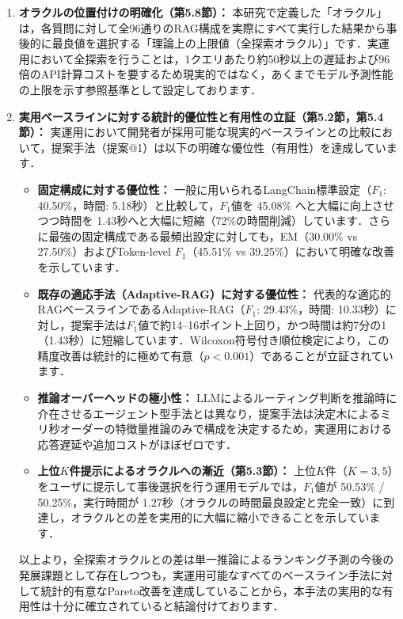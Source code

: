 \documentclass{jsarticle}
\begin{document}
\begin{enumerate}
\item \textbf{オラクルの位置付けの明確化（第5.8節）：}
本研究で定義した「オラクル」は，各質問に対して全96通りのRAG構成を実際にすべて実行した結果から事後的に最良値を選択する「理論上の上限値（全探索オラクル）」です．実運用において全探索を行うことは，1クエリあたり約50秒以上の遅延および96倍のAPI計算コストを要するため現実的ではなく，あくまでモデル予測性能の上限を示す参照基準として設定しております．

\item \textbf{実用ベースラインに対する統計的優位性と有用性の立証（第5.2節，第5.4節）：}
実運用において開発者が採用可能な現実的ベースラインとの比較において，提案手法（提案@1）は以下の明確な優位性（有用性）を達成しています．
\begin{itemize}
\item \textbf{固定構成に対する優位性：} 一般に用いられるLangChain標準設定（$F_1$: 40.50\%，時間: 5.18秒）と比較して，$F_1$値を 45.08\% へと大幅に向上させつつ時間を 1.43秒へと大幅に短縮（72\%の時間削減）しています．さらに最強の固定構成である最頻出設定に対しても，EM（30.00\% vs 27.50\%）およびToken-level $F_1$（45.51\% vs 39.25\%）において明確な改善を示しています．
\item \textbf{既存の適応手法（Adaptive-RAG）に対する優位性：} 代表的な適応的RAGベースラインであるAdaptive-RAG（$F_1$: 29.43\%，時間: 10.33秒）に対し，提案手法は$F_1$値で約14--16ポイント上回り，かつ時間は約7分の1（1.43秒）に短縮しています．Wilcoxon符号付き順位検定により，この精度改善は統計的に極めて有意（$p < 0.001$）であることが立証されています．
\item \textbf{推論オーバーヘッドの極小性：} LLMによるルーティング判断を推論時に介在させるエージェント型手法とは異なり，提案手法は決定木によるミリ秒オーダーの特徴量推論のみで構成を決定するため，実運用における応答遅延や追加コストがほぼゼロです．
\item \textbf{上位$K$件提示によるオラクルへの漸近（第5.3節）：} 上位$K$件（$K=3, 5$）をユーザに提示して事後選択を行う運用モデルでは，$F_1$値が 50.53\% / 50.25\%，実行時間が 1.27秒（オラクルの時間最良設定と完全一致）に到達し，オラクルとの差を実用的に大幅に縮小できることを示しています．
\end{itemize}
以上より，全探索オラクルとの差は単一推論によるランキング予測の今後の発展課題として存在しつつも，実運用可能なすべてのベースライン手法に対して統計的有意なPareto改善を達成していることから，本手法の実用的な有用性は十分に確立されていると結論付けております．
\end{enumerate}
\end{document}
